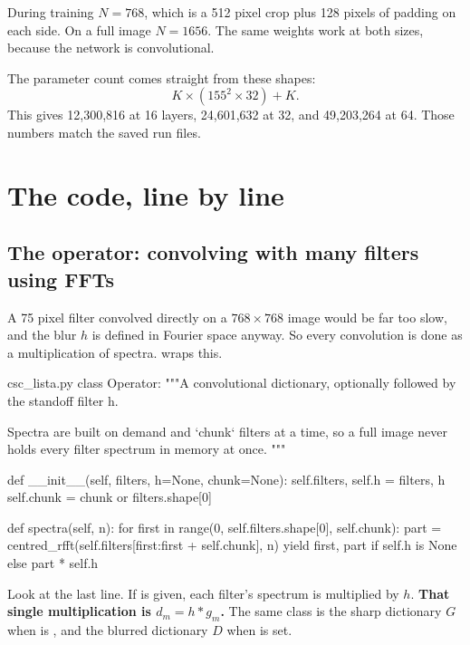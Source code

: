 During training $N=768$, which is a 512 pixel crop plus 128 pixels of padding on each side. On a
full image $N=1656$. The same weights work at both sizes, because the network is convolutional.

The parameter count comes straight from these shapes:
\begin{equation}
K \times (155^2 \times 32) + K .
\end{equation}
This gives 12,300,816 at 16 layers, 24,601,632 at 32, and 49,203,264 at 64. Those numbers match
the saved run files.

\section{The code, line by line}

\subsection*{The operator: convolving with many filters using FFTs}

A 75 pixel filter convolved directly on a $768\times768$ image would be far too slow, and the blur
$h$ is defined in Fourier space anyway. So every convolution is done as a multiplication of spectra.
 wraps this.

\begin{code*}{csc_lista.py}
class Operator:
    """A convolutional dictionary, optionally followed by the standoff filter h.

    Spectra are built on demand and `chunk` filters at a time, so a full image
    never holds every filter spectrum in memory at once.
    """

    def __init__(self, filters, h=None, chunk=None):
        self.filters, self.h = filters, h
        self.chunk = chunk or filters.shape[0]

    def spectra(self, n):
        for first in range(0, self.filters.shape[0], self.chunk):
            part = centred_rfft(self.filters[first:first + self.chunk], n)
            yield first, part if self.h is None else part * self.h
\end{code*}

Look at the last line. If  is given, each filter's spectrum is multiplied by $h$. \textbf{That
single multiplication is $d_m=h*g_m$.} The same class is the sharp dictionary $G$ when  is
, and the blurred dictionary $D$ when  is set.

